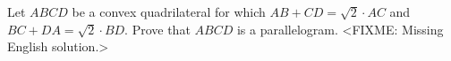 \problem
Let $ABCD$ be a convex quadrilateral for which $AB + CD = \sqrt{2} \cdot AC$
and $BC + DA = \sqrt{2} \cdot BD$.
Prove that $ABCD$ is a parallelogram.
\solution
<FIXME: Missing English solution.>
\endproblem
